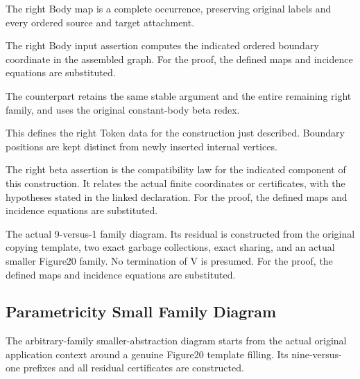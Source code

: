 The right Body map is a complete occurrence, preserving original labels and every ordered source and target attachment.
\par{}

The right Body input assertion computes the indicated ordered boundary coordinate in the assembled graph.
For the proof, the defined maps and incidence equations are substituted.
\par{}

The counterpart retains the same stable argument and the entire remaining right family, and uses the original constant-body beta redex.
\par{}

This defines the right Token data for the construction just described. Boundary positions are kept distinct from newly inserted internal vertices.
\par{}

The right beta assertion is the compatibility law for the indicated component of this construction. It relates the actual finite coordinates or certificates, with the hypotheses stated in the linked declaration.
For the proof, the defined maps and incidence equations are substituted.
\par{}

The actual 9-versus-1 family diagram. Its residual is constructed from the original copying template, two exact garbage collections, exact sharing, and an actual smaller Figure20 family. No termination of V is presumed.
For the proof, the defined maps and incidence equations are substituted.
\par{}

\subsection{Parametricity Small Family Diagram}
The arbitrary-family smaller-abstraction diagram starts from the actual original application context around a genuine Figure20 template filling. Its nine-versus-one prefixes and all residual certificates are constructed.

